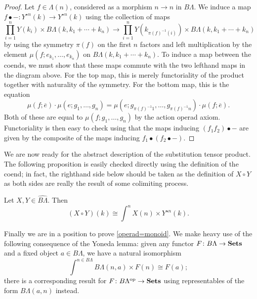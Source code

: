 \begin{proof}
Let $f \in \Lambda(n)$, considered as a morphism $n \rightarrow n$ in $B\Lambda$. We induce a map $f \bullet - \colon Y^{\star n}(k) \rightarrow Y^{\star n}(k)$ using the collection of maps
  \[
    \prod_{i=1}^{n} Y(k_{i}) \times B\Lambda(k, k_{1} + \cdots + k_{n}) \rightarrow \prod_{i=1}^{n} Y(k_{\pi (f)^{-1}(i)}) \times B\Lambda(k, k_{1} + \cdots + k_{n})
  \]
by using the symmetry $\pi(f)$ on the first $n$ factors and left multiplication by the element $\mu(f; e_{k_{1}}, \ldots, e_{k_{n}})$ on $B\Lambda(k, k_{1} + \cdots + k_{n})$. To induce a map between the coends, we must show that these maps commute with the two lefthand maps in the diagram above. For the top map, this is merely functoriality of the product together with naturality of the symmetry. For the bottom map, this is the equation
  \[
    \mu(f; \overline{e}) \cdot \mu(e; g_{1}, \ldots, g_{n}) = \mu(e; g_{\pi (f)^{-1} 1}, \ldots, g_{\pi (f)^{-1} n}) \cdot \mu(f; \overline{e}).
  \]
Both of these are equal to $\mu(f; g_{1}, \ldots, g_{n})$ by the action operad axiom. Functoriality is then easy to check using that the maps inducing $(f_{1}f_{2}) \bullet -$ are given by the composite of the maps inducing $f_{1} \bullet (f_{2} \bullet -)$.
\end{proof}

We are now ready for the abstract description of the substitution tensor product. The following proposition is easily checked directly using the definition of the coend; in fact, the righthand side below should be taken as the definition of $X \circ Y$ as both sides are really the result of some colimiting process.

\begin{prop}
  Let $X, Y \in \widehat{B\Lambda}$. Then
  \[
    (X \circ Y)(k) \cong \int^{n} X(n) \times Y^{\star n}(k).
  \]
\end{prop}

Finally we are in a position to prove \cref{operad=monoid}. We make heavy use of the following consequence of the Yoneda lemma: given any functor $F \colon B\Lambda \rightarrow \mathbf{Sets}$ and a fixed object $a \in B\Lambda$, we have a natural isomorphism
  \[
    \int^{n \in B\Lambda} B\Lambda(n,a) \times F(n) \cong F(a);
  \]
there is a corresponding result for $F \colon B\Lambda^{\textrm{op}} \rightarrow \mathbf{Sets}$ using representables of the form $B\Lambda(a,n)$ instead.

